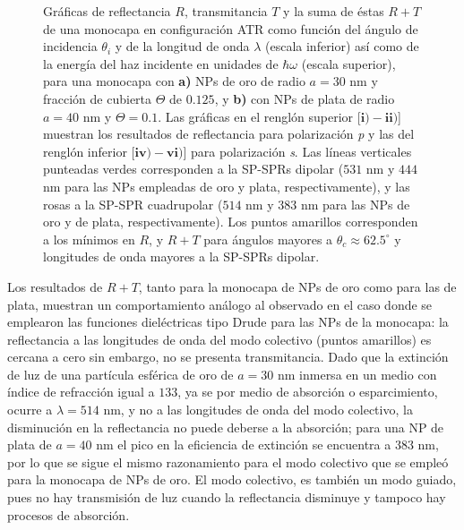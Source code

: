 \begin{figure}[h!]
\begin{subfigure}{.7\linewidth}
		\end{subfigure}\vspace*{-.5em}
	\caption{Gráficas de reflectancia $R$, transmitancia $T$ y la suma de éstas $R+T$ de una monocapa en configuración ATR como función del ángulo de incidencia $\theta_i$ y de la longitud de onda $\lambda$ (escala inferior) así como de la energía del haz incidente en unidades de $\hbar\omega$ (escala superior), para una monocapa con \textbf{a)} NPs de oro de radio $a=30$ nm y fracción de cubierta $\Theta$ de $0.125$, y \textbf{b)} con NPs de plata de radio $a=40$ nm y $\Theta=0.1$.  Las gráficas   en el renglón superior [$\mathbf{i)-ii)}$]  muestran los resultados de reflectancia para  polarización \emph{p} y las del renglón inferior  [$\mathbf{iv)-vi)}$] para polarización  \emph{s}. Las líneas verticales punteadas verdes corresponden a la SP-SPRs dipolar ($531$ nm y $444$ nm para las NPs empleadas de oro y plata, respectivamente), y las rosas a la SP-SPR cuadrupolar ($514$ nm y $383$ nm para las NPs de oro y de plata, respectivamente). Los puntos amarillos corresponden a los mínimos en $R$, y $R+T$ para ángulos mayores a $\theta_c\approx 62.5^\circ$ y longitudes de onda mayores a la SP-SPRs dipolar. }\label{fig:RT-AuAg}
	\end{figure}	

Los resultados de $R+T$, tanto para la monocapa de NPs de oro como para las de plata, muestran un comportamiento análogo al observado en el caso donde se emplearon las funciones dieléctricas tipo Drude para las NPs de la monocapa: la reflectancia a las longitudes de onda del modo colectivo (puntos amarillos) es cercana a cero sin embargo, no se presenta transmitancia. Dado que la extinción de luz de una partícula esférica de oro de $a=30$ nm inmersa en un medio con índice de refracción igual a $133$, ya se por medio de absorción o esparcimiento, ocurre a $\lambda= 514$ nm, y no a las longitudes de onda del modo colectivo, la disminución en la reflectancia no puede deberse a la absorción; para una NP de plata de $a=40$ nm el pico en la eficiencia de extinción se encuentra a $383$ nm, por lo que se sigue el mismo razonamiento para el modo colectivo que se empleó para la monocapa de NPs de oro. El modo colectivo, es  también un modo guiado, pues no hay transmisión de luz cuando la reflectancia disminuye y tampoco hay procesos de absorción.

